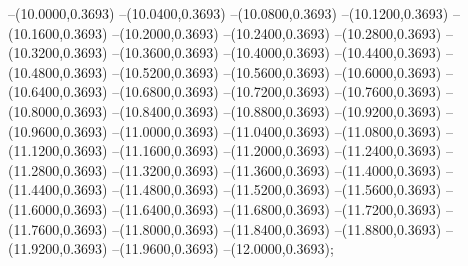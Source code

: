 {	--(10.0000,0.3693)
	--(10.0400,0.3693)
	--(10.0800,0.3693)
	--(10.1200,0.3693)
	--(10.1600,0.3693)
	--(10.2000,0.3693)
	--(10.2400,0.3693)
	--(10.2800,0.3693)
	--(10.3200,0.3693)
	--(10.3600,0.3693)
	--(10.4000,0.3693)
	--(10.4400,0.3693)
	--(10.4800,0.3693)
	--(10.5200,0.3693)
	--(10.5600,0.3693)
	--(10.6000,0.3693)
	--(10.6400,0.3693)
	--(10.6800,0.3693)
	--(10.7200,0.3693)
	--(10.7600,0.3693)
	--(10.8000,0.3693)
	--(10.8400,0.3693)
	--(10.8800,0.3693)
	--(10.9200,0.3693)
	--(10.9600,0.3693)
	--(11.0000,0.3693)
	--(11.0400,0.3693)
	--(11.0800,0.3693)
	--(11.1200,0.3693)
	--(11.1600,0.3693)
	--(11.2000,0.3693)
	--(11.2400,0.3693)
	--(11.2800,0.3693)
	--(11.3200,0.3693)
	--(11.3600,0.3693)
	--(11.4000,0.3693)
	--(11.4400,0.3693)
	--(11.4800,0.3693)
	--(11.5200,0.3693)
	--(11.5600,0.3693)
	--(11.6000,0.3693)
	--(11.6400,0.3693)
	--(11.6800,0.3693)
	--(11.7200,0.3693)
	--(11.7600,0.3693)
	--(11.8000,0.3693)
	--(11.8400,0.3693)
	--(11.8800,0.3693)
	--(11.9200,0.3693)
	--(11.9600,0.3693)
	--(12.0000,0.3693);
}
